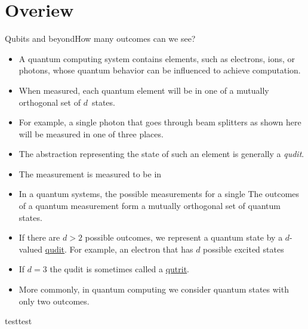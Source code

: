
\section{Overiew}
\begin{frame}{Qubits and beyond}{How many outcomes can we see?}
\begin{itemize}
    \item A quantum computing system contains elements, such as electrons, ions, or photons, whose quantum behavior can be influenced to achieve computation.
    \item When measured, each quantum element will be in one of a mutually orthogonal set of $d$~states.
    \item For example, a single photon that goes through beam splitters as shown here will be measured in one of three places.
    \item The abstraction representing the state of such an element is generally a \emph{qudit}.
    \item The measurement is measured to be in 
    \item In a quantum systems, the possible measurements for a single The outcomes of a quantum measurement form a mutually orthogonal set of quantum states.
    \item If there are $d>2$ possible outcomes, we represent a quantum state by a $d$-valued 
    \href{https://en.wiktionary.org/wiki/qudit}{qudit}.  For example, an electron that has $d$ possible excited states 
    \item If $d=3$ the qudit is sometimes called
    a \href{https://en.wikipedia.org/wiki/Qutrit}{qutrit}.
    \item More commonly, in quantum computing we consider quantum states with only two outcomes.  
    
\end{itemize}
\end{frame}
\begin{frame}{test}{test}
\begin{TIKZP}
    \LightSource{}
\end{TIKZP}

\end{frame}

